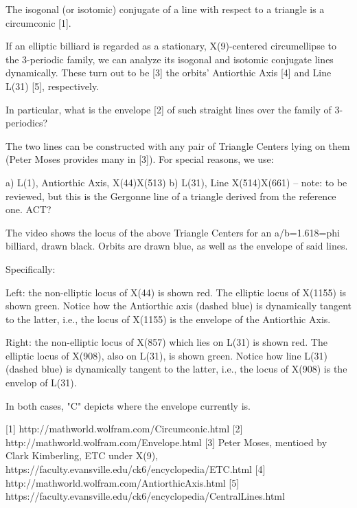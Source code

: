 The isogonal (or isotomic) conjugate of a line with respect to a triangle is a circumconic [1].

If an elliptic billiard is regarded as a stationary, X(9)-centered circumellipse to the 3-periodic family, we can analyze its isogonal and isotomic conjugate lines dynamically. These turn out to be [3] the orbits' Antiorthic Axis [4] and Line L(31) [5], respectively.

In particular, what is the envelope [2] of such straight lines over the family of 3-periodics?

The two lines can be constructed with any pair of Triangle Centers lying on them (Peter Moses provides many in [3]). For special reasons, we use:

a) L(1), Antiorthic Axis, X(44)X(513)
b) L(31), Line X(514)X(661) -- note: to be reviewed, but this is the Gergonne line of a triangle derived from the reference one. ACT?

The video shows the locus of the above Triangle Centers for an a/b=1.618=phi billiard, drawn black. Orbits are drawn blue, as well as the envelope of said lines.

Specifically:

Left: the non-elliptic locus of X(44) is shown red. The elliptic locus of X(1155) is shown green. Notice how the Antiorthic axis (dashed blue) is dynamically tangent to the latter, i.e., the locus of X(1155) is the envelope of the Antiorthic Axis.

Right: the non-elliptic locus of X(857) which lies on L(31) is shown red. The elliptic locus of X(908), also on L(31), is shown green. Notice how line L(31) (dashed blue) is dynamically tangent to the latter, i.e., the locus of X(908) is the envelop of L(31).

In both cases, "C" depicts where the envelope currently is.

[1] http://mathworld.wolfram.com/Circumconic.html
[2] http://mathworld.wolfram.com/Envelope.html
[3] Peter Moses, mentioed by Clark Kimberling, ETC under X(9), https://faculty.evansville.edu/ck6/encyclopedia/ETC.html
[4] http://mathworld.wolfram.com/AntiorthicAxis.html
[5] https://faculty.evansville.edu/ck6/encyclopedia/CentralLines.html